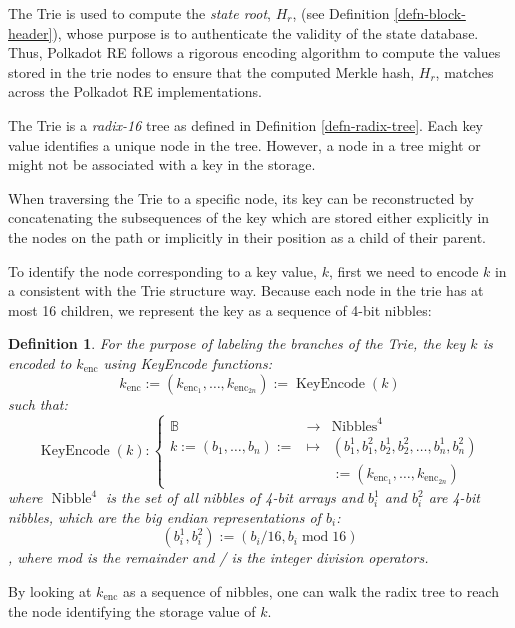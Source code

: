 \documentclass{article}
\newcommand{\assign}{:=}
\newcommand{\nosymbol}{}
\newcommand{\tmem}[1]{{\em #1\/}}
\newcommand{\tmop}[1]{\ensuremath{\operatorname{#1}}}
\newcommand{\tmtextit}[1]{{\itshape{#1}}}
\newtheorem{definition}{Definition}
\providecommand{\nosymbol}{}
\providecommand{\tmem}[1]{\tmtextit{#1}}
\providecommand{\tmop}[1]{\ensuremath{\mathrm{#1}}}
\providecommand{\tmtextit}[1]{\tmtextit{#1}}
\newtheorem{definition}{Definition}
\begin{document}
The Trie is used to compute the {\tmem{state root}}, $H_r$, (see Definition
\ref{defn-block-header}), whose purpose is to authenticate the validity of the
state database. Thus, Polkadot RE follows a rigorous encoding algorithm to
compute the values stored in the trie nodes to ensure that the computed Merkle
hash, $H_r$, matches across the Polkadot RE implementations.

The Trie is a {\tmem{radix-16}} tree as defined in Definition
\ref{defn-radix-tree}. Each key value identifies a unique node in the tree.
However, a node in a tree might or might not be associated with a key in the
storage.

When traversing the Trie to a specific node, its key can be reconstructed by
concatenating the subsequences of the key which are stored either explicitly
in the nodes on the path or implicitly in their position as a child of their
parent.

To identify the node corresponding to a key value, $k$, first we need to
encode $k$ in a consistent with the Trie structure way. Because each node in
the trie has at most 16 children, we represent the key as a sequence of 4-bit
nibbles:

\begin{definition}
  For the purpose of labeling the branches of the Trie, the key $k$ is encoded
  to $k_{\tmop{enc}}$ using KeyEncode functions:
  \begin{equation}
    k_{\tmop{enc}} \assign (k_{\tmop{enc}_1}, \ldots, k_{\tmop{enc}_{2 n}})
    \assign \tmop{KeyEncode} (k) \label{key-encode-in-trie}
  \end{equation}
  such that:
  \[ \tmop{KeyEncode} (k) : \left\{ \begin{array}{lll}
       \mathbb{B}^{\nosymbol} & \rightarrow & \tmop{Nibbles}^4\\
       k \assign (b_1, \ldots, b_n) \assign & \mapsto & (b^1_1, b^2_1, b_2^1,
       b^2_2, \ldots, b^1_n, b^2_n)\\
       &  & \assign (k_{\tmop{enc}_1}, \ldots, k_{\tmop{enc}_{2 n}})
     \end{array} \right. \]
  where $\tmop{Nibble}^4$ is the set of all nibbles of 4-bit arrays and
  $b^1_i$ and $b^2_i$ are 4-bit nibbles, which are the big endian
  representations of $b_i$:
  \[ (b^1_i, b^2_i) \assign (b_i / 16, b_i \tmop{mod} 16) \]
  , where mod is the remainder and / is the integer division operators.
\end{definition}

By looking at $k_{\tmop{enc}}$ as a sequence of nibbles, one can walk the
radix tree to reach the node identifying the storage value of $k$.
\end{document}
